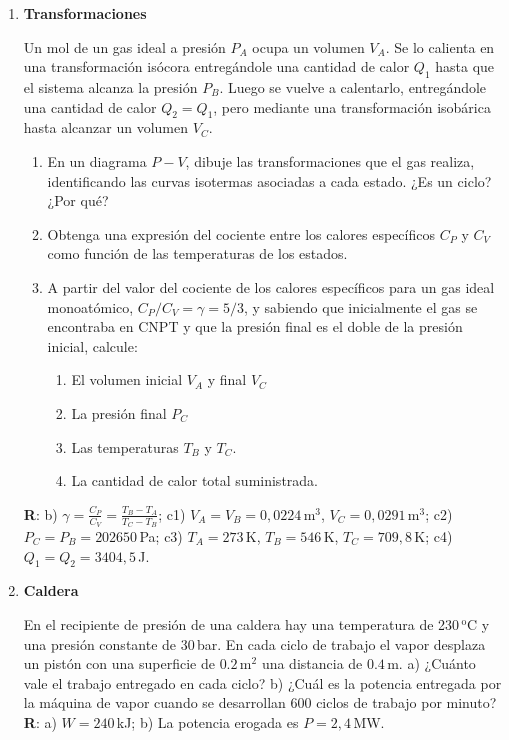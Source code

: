 \documentclass[a4paper,12pt]{article}
\begin{document}
\begin{enumerate}
	\item {\bf{Transformaciones}}
		
		Un mol de un gas ideal a presión $P_A$ ocupa un volumen $V_A$. Se lo
		calienta en una transformación isócora entregándole una cantidad de
		calor $Q_{1}$ hasta que el sistema alcanza la presión
		$P_B$. Luego se vuelve a calentarlo, entregándole una cantidad de calor
		$Q_2 = Q_1$, pero mediante una
		transformación isobárica hasta alcanzar un volumen $V_C$. 
		\begin{enumerate}
			\item En un diagrama $P-V$, dibuje las transformaciones que el gas
				realiza, identificando las curvas isotermas asociadas a cada
				estado. ¿Es un ciclo? ¿Por qué?
			\item Obtenga una expresión del cociente entre los calores
				específicos $C_P$ y $C_V$ como función de las temperaturas
				de los estados.
			\item A partir del valor del cociente de los calores específicos
				para un gas ideal monoatómico, $C_P / C_V = \gamma = 5/3$, y
				sabiendo que inicialmente el gas se encontraba en CNPT y que la
				presión final es el doble de la presión inicial, calcule:
				\begin{enumerate}
					\item El volumen inicial $V_A$ y final $V_C$
					\item La presión final $P_C$
					\item Las temperaturas $T_B$ y $T_C$. 
					\item La cantidad de calor total suministrada.
				\end{enumerate}
		\end{enumerate}
		{\bf{R}}: b) $\gamma = \frac{C_P}{C_V} = \frac{T_B-T_A}{T_C-T_B}$; c1)
		$V_A=V_B=0,0224$\,m$^3$, $V_C=0,0291$\,m$^3$; c2) $P_C=P_B=202650$\,Pa;
		c3) $T_A=273$\,K, $T_B=546$\,K, $T_C=709,8$\,K; c4)
		$Q_1=Q_2=3404,5$\,J.
		
	\item {\bf{Caldera}}
		
		En el recipiente de presión de una caldera hay una temperatura de
		230\,$^\mathrm{o}$C y una presión constante de 30\,bar. En cada ciclo
		de trabajo el vapor desplaza un pistón con una superficie de
		$0.2$\,m$^2$ una distancia de $0.4$\,m. a) ¿Cuánto vale el trabajo
		entregado en cada ciclo? b) ¿Cuál es la potencia entregada por la
		máquina de vapor cuando se desarrollan 600 ciclos de trabajo por
		minuto?
		\\{\bf{R}}: a) $W=240$\,kJ; b) La potencia erogada es $P=2,4$\,MW.
	

\end{enumerate}
\end{document}
